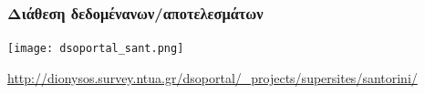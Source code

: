 \begin{frame}
  \frametitle{Διάθεση δεδομένανων/αποτελεσμάτων}
  \framesubtitle{}
  \label{}
  \vskip-1.2cm
\begin{center}
  \texttt{[image: dsoportal\_sant.png]}
\end{center}
\url{http://dionysos.survey.ntua.gr/dsoportal/\_projects/supersites/santorini/}
\end{frame}
\note{}